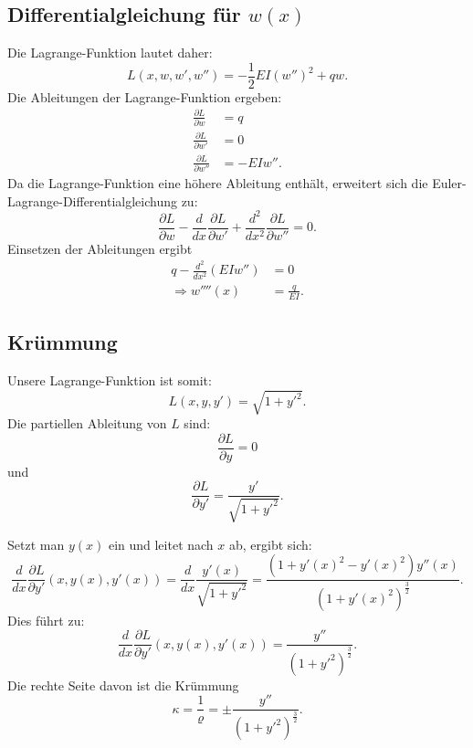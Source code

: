 \subsection{Differentialgleichung für $w(x)$}
Die Lagrange-Funktion lautet daher:
\begin{equation*}
	L(x,w,w',w'') = -\frac{1}{2} E I (w'')^2 + q w.
\end{equation*}
Die Ableitungen der Lagrange-Funktion ergeben:
\begin{align*}
	\frac{\partial L}{\partial w} &= q \\
	\frac{\partial L}{\partial w'} &= 0 \\
	\frac{\partial L}{\partial w''} &= -E I w''.
\end{align*}
Da die Lagrange-Funktion eine höhere Ableitung enthält, erweitert sich die Euler-Lagrange-Differentialgleichung zu:
\begin{equation*}
	\frac{\partial L}{\partial w} - \frac{d}{dx} \frac{\partial L}{\partial w'} + \frac{d^2}{dx^2} \frac{\partial L}{\partial w''} = 0.
\end{equation*}
Einsetzen der Ableitungen ergibt
	\begin{align}
		q - \frac{d^2}{dx^2}(E I w'') &= 0 \\
		\Rightarrow w''''(x) &= \frac{q}{E I}.
	\end{align}

\subsection{Krümmung}
Unsere Lagrange-Funktion ist somit:
\begin{equation*}
	L(x,y,y') = \sqrt{1 + {y'}^2}.
\end{equation*}
Die partiellen Ableitung von $L$ sind:
\begin{equation*}
	\frac{\partial L}{\partial y} = 0
\end{equation*}
und
\begin{equation*}
	\frac{\partial L}{\partial y'} = \frac{y'}{\sqrt{1 + {y'}^2}}.
\end{equation*}

Setzt man $y(x)$ ein und leitet nach $x$ ab, ergibt sich:
\begin{equation*}
	\frac{d}{dx} \frac{\partial L}{\partial y'}(x,y(x),y'(x)) = \frac{d}{dx} \frac{y'(x)}{\sqrt{1 + {y'}^2}} = \frac{(1 + {y'(x)}^2 - {y'(x)}^2) y''(x)}{(1 + {y'(x)}^2)^{\frac{3}{2}}}.
\end{equation*}
Dies führt zu:
\begin{equation*}
	\frac{d}{dx} \frac{\partial L}{\partial y'}(x,y(x),y'(x)) = \frac{y''}{(1 + {y'}^2)^{\frac{3}{2}}}.
\end{equation*}
Die rechte Seite davon ist die Krümmung
\begin{equation*}
	\kappa = \frac{1}{\varrho} = \pm \frac{y''}{(1 + {y'}^2)^{\frac{3}{2}}}.
\end{equation*}

